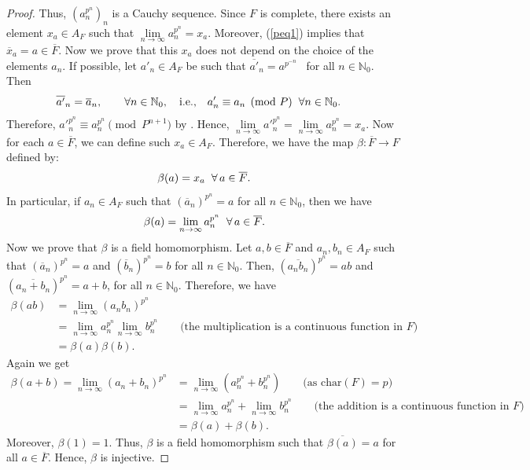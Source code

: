 \documentclass[times,10pt]{amsart}
\newcommand{\N}{\ensuremath{\mathbb{N}}}
\begin{document}
{\begin{proof}
Thus, $(a_n^{p^n})_n$ is a {Cauchy} sequence. Since  $F$ is complete, there exists an element  $x_a\in A_F$ such that $ \underset{n\to \infty}{\lim}a_n^{p^n}=x_a$. Moreover, (\ref{peq1}) implies that    $\overline{x}_a=a\in \overline{F}$.  Now we prove that  this $x_a$ does not depend on the choice of  the elements  $a_n$. If possible, let  $a'_n\in A_F$ be such that $ \overline{a'}_n= a^{p^{-n}}$ \ for all $n\in \mathbb{N}_0.$ Then \begin{align*}
          \overline{a'}_n&= \overline{a}_n, \qquad \forall n\in \mathbb{N}_0,\quad \text{i.e.,} \quad a'_n\equiv a_n\pmod{P}\hspace{2mm} \forall n\in \N_0.\end{align*}
Therefore, ${a'}_n^{p^n}\equiv  a_n^{p^n} \pmod{P^{n+1}}$ by \cite[Lemma \hspace{1mm} 33]{Sc}. Hence,  $\underset{n\to \infty}{\lim} {a'}_n^{p^n}= \underset{n\to \infty}{\lim}a_n^{p^n}=x_a.$   Now for each $a\in \overline{F}$, we can define such $x_a\in A_F$. Therefore,   we have the map $ \beta:\overline{F}\xrightarrow{} F$ defined by: \[\beta( a)=x_a\hspace{2mm} \forall\, a\in \overline{F}.\] In particular, if {$ a_n\in A_F$} such that $(\overline{a}_n)^{p^n}= a $ for all $n\in \N_0$, then we have  \begin{align}\label{peq3} \beta(a)=\lim_{n\to \infty} a_n^{p^n} \hspace{2mm} \forall\, a\in \overline{F}.\end{align}  Now we  prove that  $\beta$  is a field homomorphism. Let $ a,b\in \overline{F}$ and  $ a_n,b_n\in A_F$ such that
       $ (\overline{a}_n)^{p^n}=a$ and $(\overline{b}_n)^{p^n}=b$  for all $n\in \N_0$. Then, $({\overline{ a_nb_n}})^{p^n}= ab$ and $ (\overline{a_n+b_n})^{p^n}= a+b$, for all $n\in \N_0$. Therefore, we have  \begin{align*}\beta( ab)&= \lim_{n\to \infty}(a_nb_n)^{p^n}\\ &= \lim_{n\to \infty}a_n^{p^n}\lim_{n\to \infty} b_n^{p^n}
      \qquad \text{(the multiplication  is  a continuous function in $F$) }\\ & = \beta( a)\beta(b). \end{align*}
Again  we get \begin{align*}
          \beta( a+b)= \lim_{n\to \infty} (a_n+b_n)^{p^n}&= \lim_{n\to \infty} (a_n^{p^n}+b_n^{p^n})  \qquad \text{(as char$(F)=p$)}\\&=\lim_{n\to \infty} a_n^{p^n}+ \lim_{n\to \infty} b_n^{p^n}\qquad \text{(the addition  is a continuous function in $F$)}\\ &= \beta(a)+ \beta(b).
      \end{align*}
 Moreover, $ \beta(1)=1.$
      Thus, $\beta$ is  a field homomorphism such that $\overline{\beta(a)}=a$ for all $a\in \overline{F}.$ Hence, $\beta$ is injective.
\vskip1.5mm


\end{proof}}
\end{document}
